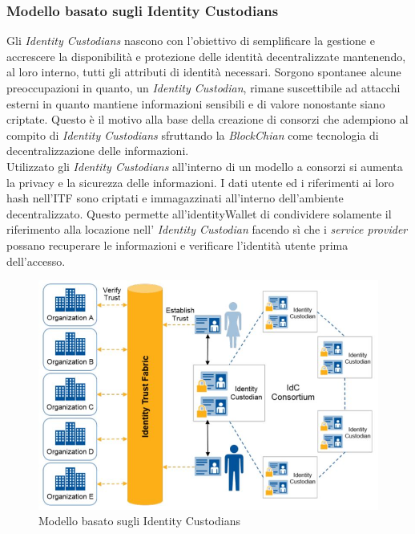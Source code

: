 \subsubsection{Modello basato sugli Identity Custodians}
Gli \textit{Identity Custodians} nascono con l'obiettivo di semplificare la gestione e accrescere la disponibilità e protezione delle identità decentralizzate mantenendo, al loro interno, tutti gli attributi di identità necessari.
Sorgono spontanee alcune preoccupazioni in quanto, un \textit{Identity Custodian}, rimane suscettibile ad attacchi esterni in quanto mantiene informazioni sensibili e di valore nonostante siano criptate. Questo è il motivo alla base della creazione di consorzi che adempiono al compito di \textit{Identity Custodians} sfruttando la \textit{BlockChian} come tecnologia di decentralizzazione delle informazioni.\\
Utilizzato gli \textit{Identity Custodians} all'interno di un modello a consorzi si aumenta la privacy e la sicurezza delle informazioni. I dati utente ed i riferimenti ai loro hash nell'\gls{ITF} sono criptati e immagazzinati all'interno dell'ambiente decentralizzato. Questo permette all'\gls{identityWallet} di condividere solamente il riferimento alla locazione nell' \textit{Identity Custodian} facendo sì che i \textit{service provider} possano recuperare le informazioni e verificare l'identità utente prima dell'accesso\cite{ITF_gartner}.
\begin{figure}[h]
	\centering
	\includegraphics[scale=0.50]{immagini/ITF_IdentityCustodians}
	\caption{Modello basato sugli Identity Custodians}
\end{figure}

